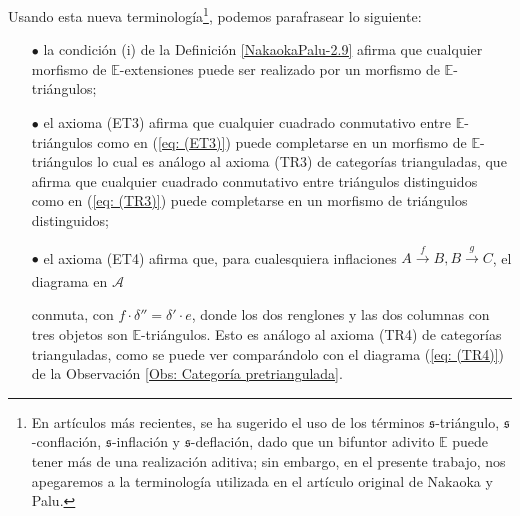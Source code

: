 \documentclass[tesis]{subfiles}
\begin{document}
\begin{Obs}\cite[Remark 2.16]{NakaokaPalu}\label{Obs: Terminología en categorías extrianguladas}

    Usando esta nueva terminología\footnote{En artículos más recientes, se ha sugerido el uso de los términos $\mathfrak{s}$-triángulo, $\mathfrak{s}$-conflación, $\mathfrak{s}$-inflación y $\mathfrak{s}$-deflación, dado que un bifuntor adivito $\mathbb{E}$ puede tener más de una realización aditiva; sin embargo, en el presente trabajo, nos apegaremos a la terminología utilizada en el artículo original de Nakaoka y Palu\cite{NakaokaPalu}.}, podemos parafrasear lo siguiente:

    \begin{itemize}

        \item[$\bullet$] la condición (i) de la Definición \ref{NakaokaPalu-2.9} afirma que cualquier morfismo de $\mathbb{E}$-extensiones puede ser realizado por un morfismo de $\mathbb{E}$-triángulos;
    
        \item[$\bullet$] el axioma (ET3) afirma que cualquier cuadrado conmutativo entre $\mathbb{E}$-triángulos como en (\ref{eq: (ET3)}) puede completarse en un morfismo de $\mathbb{E}$-triángulos \textemdash lo cual es análogo al axioma (TR3) de categorías trianguladas, que afirma que cualquier cuadrado conmutativo entre triángulos distinguidos como en (\ref{eq: (TR3)}) puede completarse en un morfismo de triángulos distinguidos;

        \item[$\bullet$] el axioma (ET4) afirma que, para cualesquiera inflaciones $A\xrightarrow[]{f}B, B\xrightarrow[]{g}C$, el diagrama en $\mathscr{A}$
            \begin{center}
            \end{center}
            conmuta, con $f\cdot\delta'' = \delta'\cdot e$, donde los dos renglones y las dos columnas con tres objetos son $\mathbb{E}$-triángulos. Esto es análogo al axioma (TR4) de categorías trianguladas, como se puede ver comparándolo con el diagrama (\ref{eq: (TR4)}) de la Observación \ref{Obs: Categoría pretriangulada}.


\end{itemize}
\end{Obs}
\end{document}
